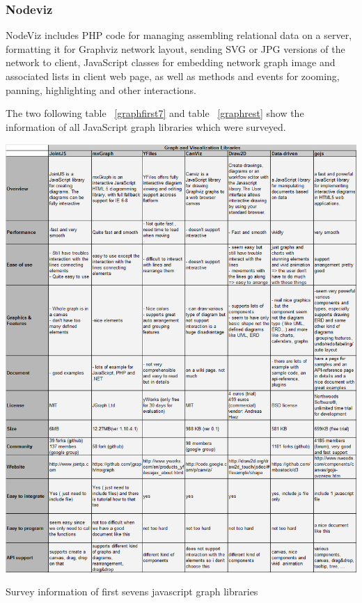 \documentclass[14pt,a4paper]{extreport}
\begin{document}
 			\subsubsection{Nodeviz}
 			NodeViz includes PHP code for managing assembling relational data on a server, formatting it for Graphviz network layout, sending SVG or JPG versions of the network to client, JavaScript classes for embedding network graph image and associated lists in client web page, as well as methods and events for zooming, panning, highlighting and other interactions.
 			
 			The two following table ~\ref{graphfirst7} and table ~\ref{graphrest} show the information of all JavaScript graph libraries which were surveyed.
 			
 			\begin{table}[ht]
 				\begin{center}
 					\includegraphics[scale=0.5]{GraphLibrary1.png}
 					\caption{Survey information of first sevens javascript graph libraries }
 					\label{graphfirst7}
 				\end{center}
 			\end{table}
 			
\end{document}
